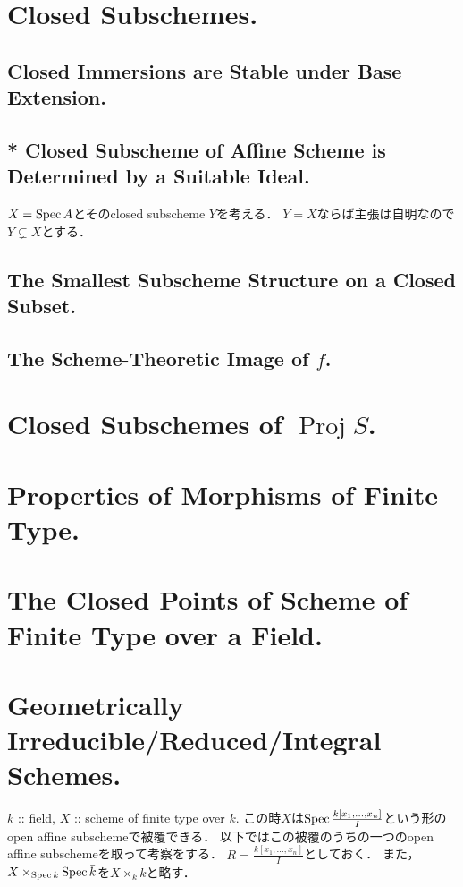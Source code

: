 \documentclass[a4paper]{jsarticle}
\newcommand{\Proj}{\operatorname{Proj}}
\begin{document}
\section{Closed Subschemes.} %
\subsection{Closed Immersions are Stable under Base Extension.}

\subsection{* Closed Subscheme of Affine Scheme is Determined by a Suitable Ideal.}
$X=\operatorname{Spec} A$とそのclosed subscheme $Y$を考える．
$Y=X$ならば主張は自明なので$Y \subsetneq X$とする．


\subsection{The Smallest Subscheme Structure on a Closed Subset.}

\subsection{The Scheme-Theoretic Image of $f$.}

\section{Closed Subschemes of $\Proj S$.} %

\section{Properties of Morphisms of Finite Type.} %

\section{The Closed Points of Scheme of Finite Type over a Field.} %

\section{Geometrically Irreducible/Reduced/Integral Schemes.} %
    $k$ :: field, $X$ :: scheme of finite type over $k$.
    この時$X$は$\operatorname{Spec} \frac{k[x_1,\dots,x_n]}{I}$という形のopen affine subschemeで被覆できる．
    以下ではこの被覆のうちの一つのopen affine subschemeを取って考察をする．
    $R=\frac{k[x_1,\dots,x_n]}{I}$としておく．
    また，$X \times_{\operatorname{Spec} k} \operatorname{Spec} \bar{k}$を$X \times_k \bar{k}$と略す．
\end{document}
